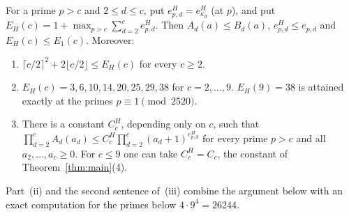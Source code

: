 \begin{lemma}
\label{lem:halved-exponent}
For a prime $p > c$ and $2 \le d \le c$, put $e^H_{p,d} = e^H_{\kappa_d}$ (at $p$), and put $E_H(c) = 1 + \max_{p>c}\sum_{d=2}^c e^H_{p,d}$. Then $A_d(a) \le B_d(a)$, $e^H_{p,d} \le e_{p,d}$ and $E_H(c) \le E_1(c)$. Moreover:
\begin{enumerate}[label=\textup{(\roman*)},leftmargin=2em]
  \item $\lceil c/2\rceil^2 + 2\lfloor c/2\rfloor \le E_H(c)$ for every $c \ge 2$.
  \item $E_H(c) = 3, 6, 10, 14, 20, 25, 29, 38$ for $c = 2,\dots,9$. $E_H(9) = 38$ is attained exactly at the primes $p \equiv 1 \pmod{2520}$.
  \item There is a constant $C^H_c$, depending only on $c$, such that $\prod_{d=2}^cA_d(a_d) \le C^H_c\prod_{d=2}^c(a_d+1)^{e^H_{p,d}}$ for every prime $p > c$ and all $a_2,\dots,a_c \ge 0$. For $c \le 9$ one can take $C^H_c = C_c$, the constant of Theorem~\ref{thm:main}(4).
\end{enumerate}
Part~(ii) and the second sentence of~(iii) combine the argument below with an exact computation for the primes below $4\cdot 9^4 = 26244$.
\end{lemma}

